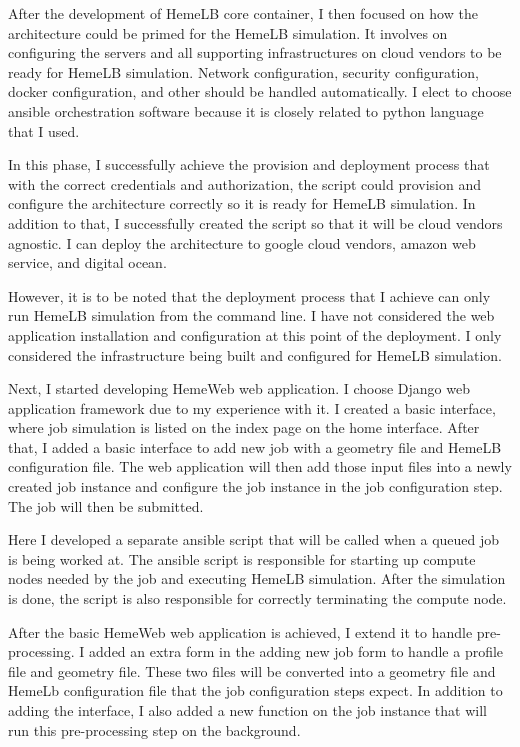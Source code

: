 After the development of HemeLB core container, I then focused on how the architecture could be primed for the HemeLB simulation. It involves on configuring the servers and all supporting infrastructures on cloud vendors to be ready for HemeLB simulation. Network configuration, security configuration, docker configuration, and other should be handled automatically. I elect to choose ansible orchestration software because it is closely related to python language that I used. 

In this phase, I successfully achieve the provision and deployment process that with the correct credentials and authorization, the script could provision and configure the architecture correctly so it is ready for HemeLB simulation. In addition to that, I successfully created the script so that it will be cloud vendors agnostic. I can deploy the architecture to google cloud vendors, amazon web service, and digital ocean.

However, it is to be noted that the deployment process that I achieve can only run HemeLB simulation from the command line. I have not considered the web application installation and configuration at this point of the deployment. I only considered the infrastructure being built and configured for HemeLB simulation.


Next, I started developing HemeWeb web application. I choose Django web application framework due to my experience with it. I created a basic interface, where job simulation is listed on the index page on the home interface. After that, I added a basic interface to add new job with a geometry file and HemeLB configuration file. The web application will then add those input files into a newly created job instance and configure the job instance in the job configuration step. The job will then be submitted. 

Here I developed a separate ansible script that will be called when a queued job is being worked at. The ansible script is responsible for starting up compute nodes needed by the job and executing HemeLB simulation. After the simulation is done, the script is also responsible for correctly terminating the compute node.

After the basic HemeWeb web application is achieved, I extend it to handle pre-processing. I added an extra form in the adding new job form to handle a profile file and geometry file. These two files will be converted into a geometry file and HemeLb configuration file that the job configuration steps expect. In addition to adding the interface, I also added a new function on the job instance that will run this pre-processing step on the background. 

